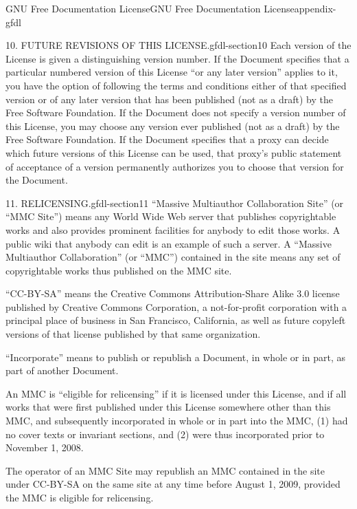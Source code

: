 \documentclass[oneside,10pt,]{book}
\numberwithin{equation}{section}
\begin{document}
\begin{appendixptx}{GNU Free Documentation License}{}{GNU Free Documentation License}{}{}{appendix-gfdl}
\begin{paragraphs}{10. FUTURE REVISIONS OF THIS LICENSE.}{gfdl-section10}
Each version of the License is given a distinguishing version number. If the Document specifies that a particular numbered version of this License ``or any later version'' applies to it, you have the option of following the terms and conditions either of that specified version or of any later version that has been published (not as a draft) by the Free Software Foundation. If the Document does not specify a version number of this License, you may choose any version ever published (not as a draft) by the Free Software Foundation. If the Document specifies that a proxy can decide which future versions of this License can be used, that proxy's public statement of acceptance of a version permanently authorizes you to choose that version for the Document.%
\end{paragraphs}%
\begin{paragraphs}{11. RELICENSING.}{gfdl-section11}%
\hypertarget{p-757}{}%
``Massive Multiauthor Collaboration Site'' (or ``MMC Site'') means any World Wide Web server that publishes copyrightable works and also provides prominent facilities for anybody to edit those works. A public wiki that anybody can edit is an example of such a server. A ``Massive Multiauthor Collaboration'' (or ``MMC'') contained in the site means any set of copyrightable works thus published on the MMC site.%
\par
\hypertarget{p-758}{}%
``CC-BY-SA'' means the Creative Commons Attribution-Share Alike 3.0 license published by Creative Commons Corporation, a not-for-profit corporation with a principal place of business in San Francisco, California, as well as future copyleft versions of that license published by that same organization.%
\par
\hypertarget{p-759}{}%
``Incorporate'' means to publish or republish a Document, in whole or in part, as part of another Document.%
\par
\hypertarget{p-760}{}%
An MMC is ``eligible for relicensing'' if it is licensed under this License, and if all works that were first published under this License somewhere other than this MMC, and subsequently incorporated in whole or in part into the MMC, (1) had no cover texts or invariant sections, and (2) were thus incorporated prior to November 1, 2008.%
\par
\hypertarget{p-761}{}%
The operator of an MMC Site may republish an MMC contained in the site under CC-BY-SA on the same site at any time before August 1, 2009, provided the MMC is eligible for relicensing.%
\end{paragraphs}%

\end{appendixptx}
\end{document}

